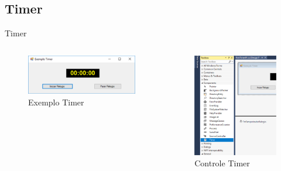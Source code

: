 	\subsection{Timer}

	\begin{frame}

\begin{CaixaModelo01}{Timer}
		
	\begin{columns}
		\begin{column}{0.48\textwidth}
			\begin{figure}
				\includegraphics[scale=.35]{./Figuras/Timer01}
				\caption{Exemplo Timer}
				\label{fig:Timer01}
			\end{figure}
		\end{column}
		\begin{column}{0.48\textwidth}
			\begin{figure}
				\includegraphics[scale=.3]{./Figuras/Timer02}
				\caption{Controle Timer}
				\label{fig:Timer02}
			\end{figure}
		\end{column}
	\end{columns}	
\end{CaixaModelo01}


\end{frame}